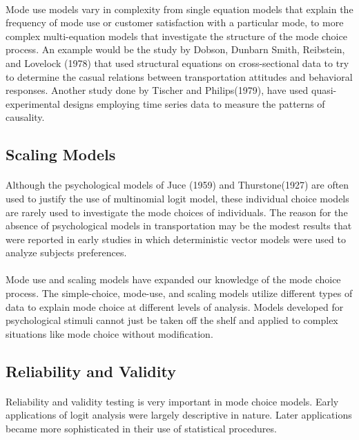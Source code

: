 \paragraph{}Mode use models vary in complexity from single equation models that explain the frequency of mode use or customer satisfaction with a particular mode, to more complex multi-equation models that investigate the structure of the mode choice process. An example would be the study by Dobson, Dunbarn Smith, Reibstein, and Lovelock (1978) that used structural equations on cross-sectional data to try to determine the casual relations between transportation attitudes and behavioral responses. Another study done by Tischer and Philips(1979), have used quasi-experimental designs employing time series data to measure the patterns of causality.

\subsection{Scaling Models}
\paragraph{}Although the psychological models of Juce (1959) and Thurstone(1927) are often used to justify the use of multinomial logit model, these individual choice models are rarely used to investigate the mode choices of individuals.  The reason for the absence of psychological models in transportation may be the modest results that were reported in early studies in which deterministic vector models were used to analyze subjects preferences.
\paragraph{}Mode use and scaling models have expanded our knowledge of the mode choice process. The simple-choice, mode-use, and scaling models utilize different types of data to explain mode choice at different levels of analysis. Models developed for psychological stimuli cannot just be taken off the shelf and applied to complex situations like mode choice without modification.

\subsection{Reliability and Validity}
\paragraph{}Reliability and validity testing is very important in mode choice models. Early applications of logit analysis were largely descriptive in nature. Later applications became more sophisticated in their use of statistical procedures.

